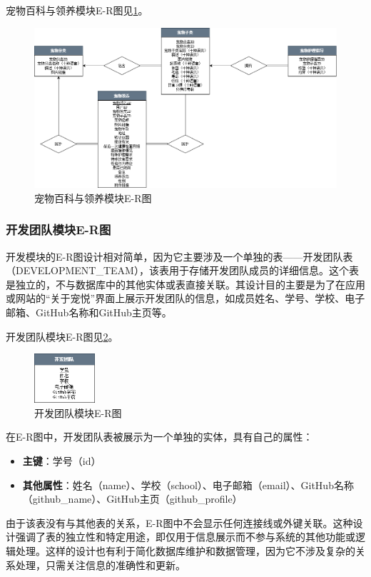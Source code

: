 宠物百科与领养模块E-R图见\cref{fig:PetEncyclopediaAndAdoptionERDiagram}。

\begin{figure}[htbp]
    \centering
    \includegraphics[width=\textwidth]{figures/PetEncyclopediaAndAdoptionERDiagram.png}
    \caption{宠物百科与领养模块E-R图}
    \label{fig:PetEncyclopediaAndAdoptionERDiagram}
\end{figure}

\subsubsection{开发团队模块E-R图}

开发模块的E-R图设计相对简单，因为它主要涉及一个单独的表——开发团队表（DEVELOPMENT\_TEAM），该表用于存储开发团队成员的详细信息。这个表是独立的，不与数据库中的其他实体或表直接关联。其设计目的主要是为了在应用或网站的“关于宠悦”界面上展示开发团队的信息，如成员姓名、学号、学校、电子邮箱、GitHub名称和GitHub主页等。

开发团队模块E-R图见\cref{fig:DevelopmentTeamERDiagram}。

\begin{figure}[htbp]
    \centering
    \includegraphics[width=0.2\textwidth]{figures/DevelopmentTeamERDiagram.png}
    \caption{开发团队模块E-R图}
    \label{fig:DevelopmentTeamERDiagram}
\end{figure}

在E-R图中，开发团队表被展示为一个单独的实体，具有自己的属性：

\begin{itemize}
    \item \textbf{主键}：学号（id）
    \item \textbf{其他属性}：姓名（name）、学校（school）、电子邮箱（email）、GitHub名称（github\_name）、GitHub主页（github\_profile）
\end{itemize}

由于该表没有与其他表的关系，E-R图中不会显示任何连接线或外键关联。这种设计强调了表的独立性和特定用途，即仅用于信息展示而不参与系统的其他功能或逻辑处理。这样的设计也有利于简化数据库维护和数据管理，因为它不涉及复杂的关系处理，只需关注信息的准确性和更新。